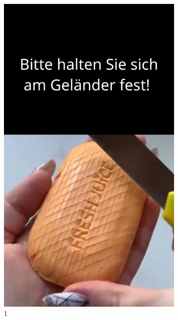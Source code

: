 \documentclass{article}
\begin{document}
\begin{figure}[H]
    \centering
    \begin{subfigure}[t]{0.45\textwidth}
        \centering
        \includegraphics[width=\textwidth]{./resources/StairTikTokBrain_1.png}
        \caption{1}
    \end{subfigure}
    \hfill
    \begin{subfigure}[t]{0.45\textwidth}
        \centering

\end{subfigure}
\end{figure}
\end{document}
